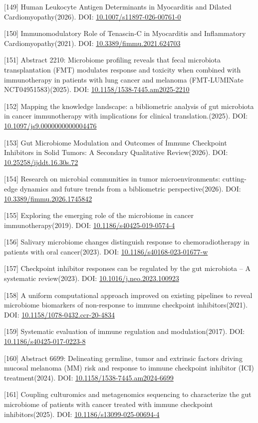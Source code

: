 {[}149{]} Human Leukocyte Antigen Determinants in Myocarditis and Dilated Cardiomyopathy(2026). DOI: \url{10.1007/s11897-026-00761-0}

{[}150{]} Immunomodulatory Role of Tenascin-C in Myocarditis and Inflammatory Cardiomyopathy(2021). DOI: \url{10.3389/fimmu.2021.624703}

{[}151{]} Abstract 2210: Microbiome profiling reveals that fecal microbiota transplantation (FMT) modulates response and toxicity when combined with immunotherapy in patients with lung cancer and melanoma (FMT-LUMINate NCT04951583)(2025). DOI: \url{10.1158/1538-7445.am2025-2210}

{[}152{]} Mapping the knowledge landscape: a bibliometric analysis of gut microbiota in cancer immunotherapy with implications for clinical translation.(2025). DOI: \url{10.1097/js9.0000000000004476}

{[}153{]} Gut Microbiome Modulation and Outcomes of Immune Checkpoint Inhibitors in Solid Tumors: A Secondary Qualitative Review(2026). DOI: \url{10.25258/ijddt.16.30s.72}

{[}154{]} Research on microbial communities in tumor microenvironments: cutting-edge dynamics and future trends from a bibliometric perspective(2026). DOI: \url{10.3389/fimmu.2026.1745842}

{[}155{]} Exploring the emerging role of the microbiome in cancer immunotherapy(2019). DOI: \url{10.1186/s40425-019-0574-4}

{[}156{]} Salivary microbiome changes distinguish response to chemoradiotherapy in patients with oral cancer(2023). DOI: \url{10.1186/s40168-023-01677-w}

{[}157{]} Checkpoint inhibitor responses can be regulated by the gut microbiota -- A systematic review(2023). DOI: \url{10.1016/j.neo.2023.100923}

{[}158{]} A uniform computational approach improved on existing pipelines to reveal microbiome biomarkers of non-response to immune checkpoint inhibitors(2021). DOI: \url{10.1158/1078-0432.ccr-20-4834}

{[}159{]} Systematic evaluation of immune regulation and modulation(2017). DOI: \url{10.1186/s40425-017-0223-8}

{[}160{]} Abstract 6699: Delineating germline, tumor and extrinsic factors driving mucosal melanoma (MM) risk and response to immune checkpoint inhibitor (ICI) treatment(2024). DOI: \url{10.1158/1538-7445.am2024-6699}

{[}161{]} Coupling culturomics and metagenomics sequencing to characterize the gut microbiome of patients with cancer treated with immune checkpoint inhibitors(2025). DOI: \url{10.1186/s13099-025-00694-4}

